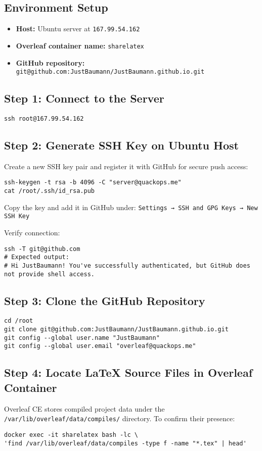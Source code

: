 \subsection{Environment Setup}
\begin{itemize}
  \item \textbf{Host:} Ubuntu server at \texttt{167.99.54.162}
  \item \textbf{Overleaf container name:} \texttt{sharelatex}
  \item \textbf{GitHub repository:} \texttt{git@github.com:JustBaumann/JustBaumann.github.io.git}
\end{itemize}

\subsection{Step 1: Connect to the Server}
\begin{verbatim}
ssh root@167.99.54.162
\end{verbatim}

\subsection{Step 2: Generate SSH Key on Ubuntu Host}
Create a new SSH key pair and register it with GitHub for secure push access:
\begin{verbatim}
ssh-keygen -t rsa -b 4096 -C "server@quackops.me"
cat /root/.ssh/id_rsa.pub
\end{verbatim}

Copy the key and add it in GitHub under:
\texttt{Settings → SSH and GPG Keys → New SSH Key}

Verify connection:
\begin{verbatim}
ssh -T git@github.com
# Expected output:
# Hi JustBaumann! You've successfully authenticated, but GitHub does not provide shell access.
\end{verbatim}

\subsection{Step 3: Clone the GitHub Repository}
\begin{verbatim}
cd /root
git clone git@github.com:JustBaumann/JustBaumann.github.io.git
git config --global user.name "JustBaumann"
git config --global user.email "overleaf@quackops.me"
\end{verbatim}

\subsection{Step 4: Locate \LaTeX{} Source Files in Overleaf Container}
Overleaf CE stores compiled project data under the \texttt{/var/lib/overleaf/data/compiles/} directory.
To confirm their presence:
\begin{verbatim}
docker exec -it sharelatex bash -lc \
'find /var/lib/overleaf/data/compiles -type f -name "*.tex" | head'
\end{verbatim}

